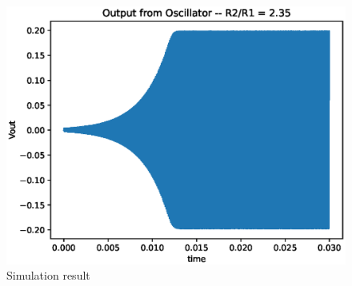 \begin{enumerate}[label=\arabic*.,ref=\theenumi]
\begin{figure}[!ht]
\centering
\includegraphics[width=\columnwidth]{./figs/ee18btech11049/ee18btech11049_4.eps}
\caption{Simulation result}
\label{fig:ee18btech11049_final}
\end{figure}

\end{enumerate}
